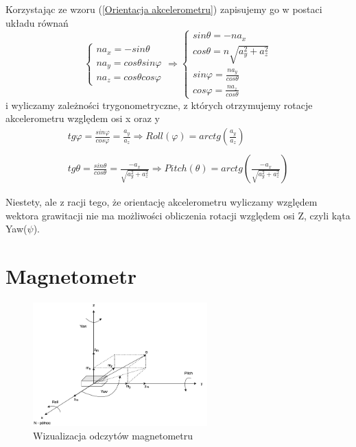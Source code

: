 Korzystając ze wzoru (\ref{Orientacja akcelerometru}) zapisujemy go w postaci układu równań
$$
    \left\{
        \begin{array}{l}
            na_x = -sin\theta\\
            na_y = cos\theta sin\varphi\\
            na_z = cos\theta cos\varphi
        \end{array}
    \right.
    \Rightarrow
    \left\{
        \begin{array}{l}
            sin\theta = -na_x \\
            cos\theta = n\sqrt{a_y^2 + a_z^2} \\
            sin\varphi = \frac{na_y}{cos\theta} \\
            cos\varphi = \frac{na_z}{cos\theta}
        \end{array}
    \right.
$$
i wyliczamy zależności trygonometryczne, z których otrzymujemy rotacje akcelerometru względem osi x oraz y
\begin{equation}
    \begin{array}{l}
        tg\varphi = \frac{sin\varphi}{cos\varphi} = \frac{a_y}{a_z} \Rightarrow Roll(\varphi) = arctg(\frac{a_y}{a_z}) \\ \\
        tg\theta = \frac{sin\theta}{cos\theta} = \frac{-a_x}{\sqrt{a_y^2+a_z^2}} \Rightarrow Pitch(\theta) = arctg\left(\frac{-a_x}{\sqrt{a_y^2+a_z^2}}\right)
    \end{array}
\end{equation}

Niestety, ale z racji tego, że orientację akcelerometru wyliczamy względem wektora grawitacji nie ma możliwości obliczenia rotacji względem osi Z, czyli kąta Yaw($\psi$).

\section{Magnetometr}

\begin{figure}[h!]
    \centering
    \includegraphics[width=0.6\textwidth]{Rysunki/Rozdzial03/Magnetometr.png}
    \caption{Wizualizacja odczytów magnetometru}
    \label{Rotacja magnetometru}
\end{figure}

